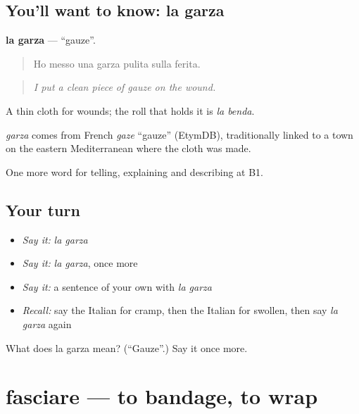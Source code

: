 \subsection*{You'll want to know: la garza}
\textbf{la garza} — \textquotedblleft{}gauze\textquotedblright{}.

\begin{quote}
Ho messo una garza pulita sulla ferita.
\end{quote}

\begin{quote}
\emph{I put a clean piece of gauze on the wound.}
\end{quote}

A thin cloth for wounds; the roll that holds it is \emph{la benda}.

\begin{cousinweb}
\emph{garza} comes from French \emph{gaze} \textquotedblleft{}gauze\textquotedblright{} (EtymDB), traditionally linked to a town on the eastern Mediterranean where the cloth was made.
\end{cousinweb}

\begin{grammarlens}[title={What you've built}]
One more word for telling, explaining and describing at B1.
\end{grammarlens}

\subsection*{Your turn}
\begin{itemize}
\raggedright
  \item \emph{Say it:} \emph{la garza}
  \item \emph{Say it:} \emph{la garza}, once more
  \item \emph{Say it:} a sentence of your own with \emph{la garza}
  \item \emph{Recall:} say the Italian for cramp, then the Italian for swollen, then say \emph{la garza} again
\end{itemize}

\begin{tcolorbox}[breakable,colback=teal!4,colframe=teal!35!black,title={Before you move on}]
What does la garza mean? (\textquotedblleft{}Gauze\textquotedblright{}.) Say it once more.
\end{tcolorbox}
\section[fasciare]{fasciare — to bandage, to wrap}

